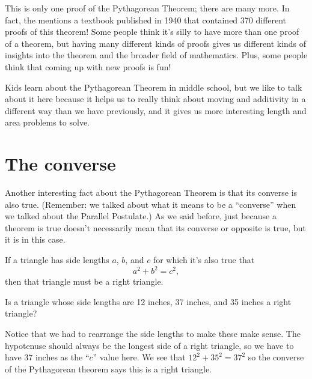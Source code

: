 \documentclass{ximera}
\begin{document}
This is only one proof of the Pythagorean Theorem; there are many more. In fact, the  mentions a textbook published in 1940 that contained 370 different proofs of this theorem! Some people think it's silly to have more than one proof of a theorem, but having many different kinds of proofs gives us different kinds of insights into the theorem and the broader field of mathematics. Plus, some people think that coming up with new proofs is fun!



Kids learn about the Pythagorean Theorem in middle school, but we like to talk about it here because it helps us to really think about moving and additivity in a different way than we have previously, and it gives us more interesting length and area problems to solve.

\section{The converse}

Another interesting fact about the Pythagorean Theorem is that its converse is also true. (Remember: we talked about what it means to be a ``converse'' when we talked about the Parallel Postulate.) As we said before, just because a theorem is true doesn't necessarily mean that its converse or opposite is true, but it is in this case.


\begin{theorem}
If a triangle has side lengths $a$, $b$, and $c$ for which it's also true that
\[
a^2 + b^2 = c^2,
\]
then that triangle must be a right triangle.
\end{theorem}

\begin{question}
Is a triangle whose side lengths are 12 inches, 37 inches, and 35 inches a right triangle?
\begin{multipleChoice}
\end{multipleChoice}
\begin{feedback}[correct] Notice that we had to rearrange the side lengths to make these make sense. The hypotenuse should always be the longest side of a right triangle, so we have to have 37 inches as the ``$c$'' value here. We see that $12^2 + 35^2 = 37^2$ so the converse of the Pythagorean theorem says this is a right triangle.
\end{feedback}
\end{question}
\end{document}
